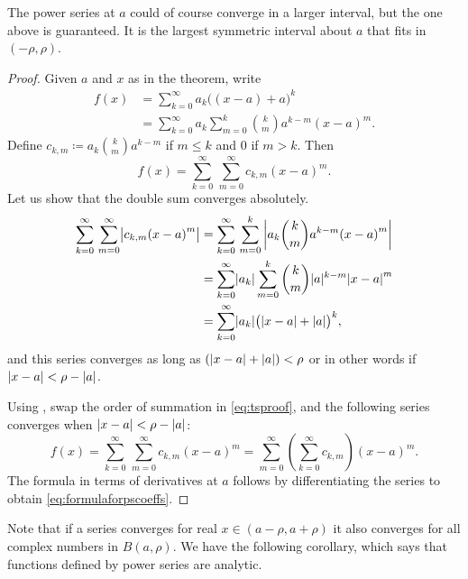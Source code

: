 The power series at $a$ could of course converge in a larger interval, but
the one above is guaranteed.  It is the largest symmetric interval about
$a$ that fits in $(-\rho,\rho)$.

\begin{proof}
Given $a$ and $x$ as in the theorem,
write
\begin{equation*}
\begin{split}
f(x) &= \sum_{k=0}^\infty a_k {\bigl((x-a)+a\bigr)}^k \\
&= \sum_{k=0}^\infty a_k \sum_{m=0}^k \binom{k}{m} a^{k-m} {(x-a)}^m .
\end{split}
\end{equation*}
Define $c_{k,m} \coloneqq a_k \binom{k}{m} a^{k-m}$ if $m \leq k$ and $0$ if $m >
k$.  Then 
\begin{equation} \label{eq:tsproof}
f(x) = \sum_{k=0}^\infty \, \sum_{m=0}^\infty c_{k,m} {(x-a)}^m .
\end{equation}
Let us show that the double sum converges absolutely.
\begin{equation*}
\begin{split}
\sum_{k=0}^\infty \, \sum_{m=0}^\infty \bigl\lvert { c_{k,m} {(x-a)}^m} \bigr\rvert
& = \sum_{k=0}^\infty \, \sum_{m=0}^k \left\lvert { a_k \binom{k}{m} a^{k-m} {(x-a)}^m } \right\rvert
\\
& = \sum_{k=0}^\infty \lvert {a_k} \rvert \sum_{m=0}^k \binom{k}{m} \lvert {a} \rvert^{k-m}
{\lvert {x-a} \rvert}^m  \\
& = \sum_{k=0}^\infty \lvert {a_k} \rvert {\bigl(\lvert {x-a} \rvert+\lvert {a} \rvert\bigr)}^k ,
\end{split}
\end{equation*}
and this series converges as long as 
$(\lvert {x-a} \rvert+\lvert {a} \rvert) < \rho$ or in other words if
$\lvert {x-a} \rvert < \rho-\lvert {a} \rvert$.

Using ,
swap the order of summation in \eqref{eq:tsproof}, and 
the following series converges when $\lvert {x-a} \rvert < \rho-\lvert {a} \rvert$:
\begin{equation*}
f(x) =
\sum_{k=0}^\infty \, \sum_{m=0}^\infty c_{k,m} {(x-a)}^m
=
\sum_{m=0}^\infty
\left( \sum_{k=0}^\infty
c_{k,m} \right) {(x-a)}^m .
\end{equation*}
The formula in terms of derivatives at $a$ follows by
differentiating the series to obtain \eqref{eq:formulaforpscoeffs}.
\end{proof}

Note that if a series converges for real $x \in (a-\rho,a+\rho)$ it also converges
for all complex numbers in $B(a,\rho)$.
We have the following corollary, which says that functions defined
by power series are analytic.

